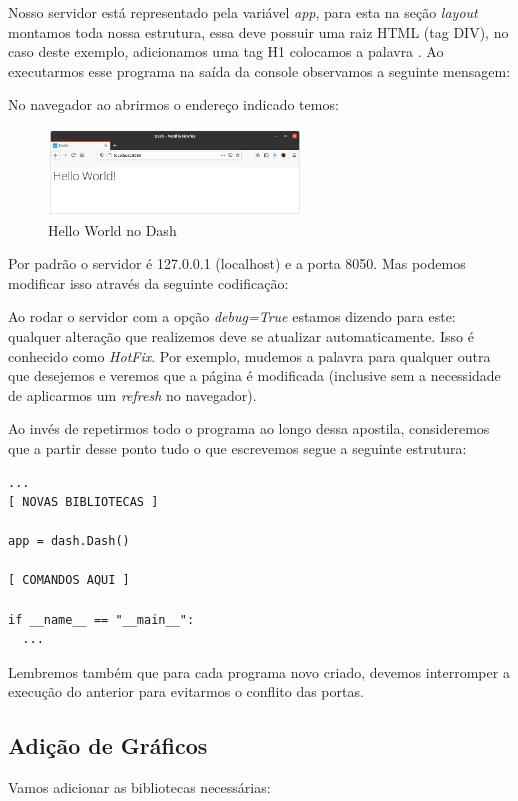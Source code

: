 \documentclass[a4paper,11pt]{article}
\begin{document}
Nosso servidor está representado pela variável \textit{app}, para esta na seção \textit{layout} montamos toda nossa estrutura, essa deve possuir uma raiz HTML (tag DIV), no caso deste exemplo, adicionamos uma tag H1 colocamos a palavra . Ao executarmos esse programa na saída da console observamos a seguinte mensagem: \\

No navegador ao abrirmos o endereço indicado temos:
\begin{figure}[H]
	\centering
	\includegraphics[width=0.6\textwidth]{imagem/hello}
	\caption{Hello World no Dash}
\end{figure}

Por padrão o servidor é 127.0.0.1 (localhost) e a porta 8050. Mas podemos modificar isso através da seguinte codificação: \\

Ao rodar o servidor com a opção \textit{debug=True} estamos dizendo para este: qualquer alteração que realizemos deve se atualizar automaticamente. Isso é conhecido como \textit{HotFix}. Por exemplo, mudemos a palavra  para qualquer outra que desejemos e veremos que a página é modificada (inclusive sem a necessidade de aplicarmos um \textit{refresh} no navegador).

Ao invés de repetirmos todo o programa ao longo dessa apostila, consideremos que a partir desse ponto tudo o que escrevemos segue a seguinte estrutura:
\begin{lstlisting}[]
...
[ NOVAS BIBLIOTECAS ]

app = dash.Dash()

[ COMANDOS AQUI ]

if __name__ == "__main__":
  ...
\end{lstlisting}

Lembremos também que para cada programa novo criado, devemos interromper a execução do anterior para evitarmos o conflito das portas.

\subsection{Adição de Gráficos}
Vamos adicionar as bibliotecas necessárias: \\
\end{document}
